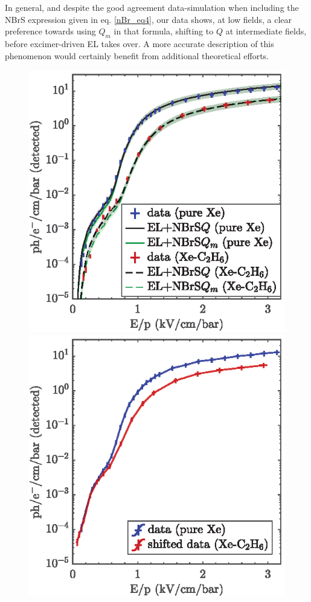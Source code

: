 \documentclass[%
 reprint,
superscriptaddress,
 amsmath,amssymb,
 aps,
]{revtex4-2}
\begin{document}
In general, and despite the good agreement data-simulation when including the NBrS expression given in eq. \ref{nBr_eq4}, our data shows, at low fields, a clear preference towards using $Q_m$ in that formula, shifting to $Q$ at intermediate fields, before excimer-driven EL takes over. A more accurate description of this phenomenon would certainly benefit from additional theoretical efforts.

\begin{figure}[tbp]
\centering %
\includegraphics[]{Fig12a.eps}
\includegraphics[]{Fig12b.eps}

\end{figure}
\end{document}
